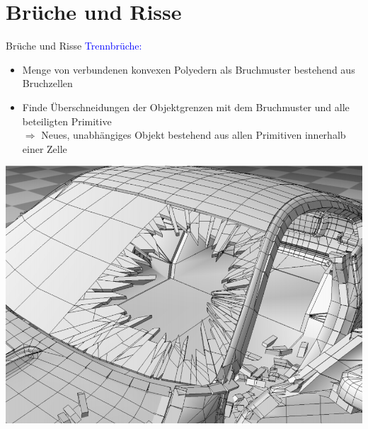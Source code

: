 \documentclass[t]{beamer}
\begin{document}
	\section{Brüche und Risse}
	\begin{frame}{Brüche und Risse}
		\textcolor{blue}{Trennbrüche:}
		\begin{itemize}
			\item Menge von verbundenen konvexen Polyedern als Bruchmuster bestehend aus Bruchzellen
		\end{itemize}
			\begin{minipage}{0.6\textwidth}
				\begin{itemize}
					\item Finde Überschneidungen der Objektgrenzen mit dem Bruchmuster und alle beteiligten Primitive\\
					$\Rightarrow$ Neues, unabhängiges Objekt bestehend aus allen Primitiven innerhalb einer Zelle 
				\end{itemize}
			\end{minipage}\begin{minipage}{0.4\textwidth}
				\begin{center}
					\centering
					\includegraphics[scale = 0.2]{GlassFracture.png}
				\end{center}
			\end{minipage}
	\end{frame}
\end{document}
